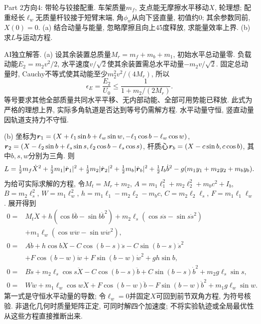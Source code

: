 \begin{exercise}
Part 2方向4: 带轮与铰接配重. 车架质量$m_f$, 支点能无摩擦水平移动$X$, 轮理想; 配重经长$\ell_w$无质量杆铰接于短臂末端, 角$\phi_w$从向下竖直量, 初值约0; 其余参数同前, $X(0)=0$. (a) 结合动量与能量, 忽略摩擦且向上45度释放, 求能量效率上界. (b) 求$L$与运动方程.
\end{exercise}
\begin{solution}
AI独立解答. (a) 设其余装置总质量$M_r=m_f+m_b+m_1$, 初始水平总动量零. 负载动能$E_2=m_2v^2/2$, 水平速度$v/\sqrt2$使其余装置需总水平动量$-m_2v/\sqrt2$. 固定总动量时, Cauchy不等式使其动能至少$m_2^2v^2/(4M_r)$, 所以
\[
\epsilon_E=\frac{E_2}{U_0}\le\frac{1}{1+m_2/(2M_r)}.
\]
等号要求其他全部质量共同水平平移、无内部动能、全部可用势能已释放. 此式为严格的理想上界, 实际多角轨道是否达到等号仍需解方程. 水平动量守恒, 竖直动量因轨道支持力不守恒.

(b) 坐标为$\boldsymbol{r}_1=(X+\ell_1\sin b+\ell_w\sin w,-\ell_1\cos b-\ell_w\cos w)$, $\boldsymbol{r}_2=(X-\ell_2\sin b+\ell_s\sin s,\ell_2\cos b-\ell_s\cos s)$, 杆质心$\boldsymbol{r}_b=(X-c\sin b,c\cos b)$, 其中$b,s,w$分别为三角. 则
\[
L=\tfrac12m_f\dot X^2+\tfrac12m_1|\dot{\boldsymbol{r}}_1|^2
+\tfrac12m_2|\dot{\boldsymbol{r}}_2|^2+\tfrac12m_b|\dot{\boldsymbol{r}}_b|^2
+\tfrac12I_b\dot b^2-g(m_1y_1+m_2y_2+m_by_b).
\]
为给可实际求解的方程, 令$M_t=M_r+m_2$, $A=m_1\ell_1^2+m_2\ell_2^2+m_bc^2+I_b$, $B=m_2\ell_s^2$, $W=m_1\ell_w^2$, $h=m_1\ell_1-m_2\ell_2-m_bc$, $C=m_2\ell_2\ell_s$, $F=m_1\ell_1\ell_w$. 展开得到
\begin{align*}
0={}&M_t\ddot X+h(\cos b\ddot b-\sin b\dot b^2)
+m_2\ell_s(\cos s\ddot s-\sin s\dot s^2)\\
&+m_1\ell_w(\cos w\ddot w-\sin w\dot w^2),\\
0={}&A\ddot b+h\cos b\ddot X-C\cos(b-s)\ddot s-C\sin(b-s)\dot s^2\\
&+F\cos(b-w)\ddot w+F\sin(b-w)\dot w^2+gh\sin b,\\
0={}&B\ddot s+m_2\ell_s\cos s\ddot X-C\cos(b-s)\ddot b
+C\sin(b-s)\dot b^2+m_2g\ell_s\sin s,\\
0={}&W\ddot w+m_1\ell_w\cos w\ddot X+F\cos(b-w)\ddot b
-F\sin(b-w)\dot b^2+m_1g\ell_w\sin w.
\end{align*}
第一式是守恒水平动量的导数; 令$\ell_w=0$并固定$X$可回到前节双角方程, 为符号核验. 非退化几何时质量矩阵正定, 可同时解四个加速度; 不将实验轨迹或全局最优性从这些方程直接推断出来.
\end{solution}
